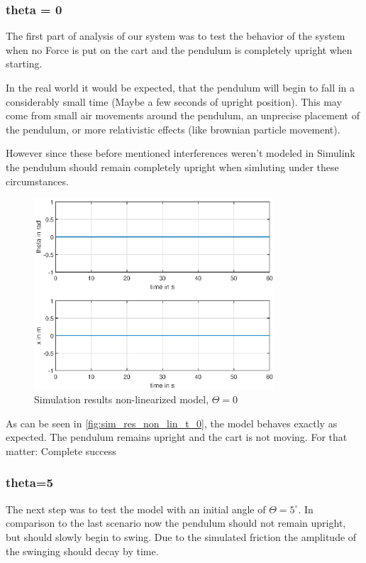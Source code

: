 \subsubsection{theta = 0}
The first part of analysis of our system was to test the behavior of the system when no Force is put on the cart and the pendulum is completely upright when starting.

In the \grqq real world \grqq it would be expected, that the pendulum will begin to fall in a considerably small time (Maybe a few seconds of upright position). This may come from small air movements around the pendulum, an unprecise placement of the pendulum, or more relativistic effects (like brownian particle movement). 

However since these before mentioned interferences weren't modeled in Simulink the pendulum should remain completely upright when simluting under these circumstances. 
\begin{figure}[H]
    \centering
    \includegraphics[width=0.8\textwidth]{Lab_report/pics/plots/non_linearized_results_theta_0.eps}
    \caption{Simulation results non-linearized model, $\Theta=0$}
    \label{fig:sim_res_non_lin_t_0}
\end{figure}

As can be seen in \autoref{fig:sim_res_non_lin_t_0}, the model behaves exactly as expected. The pendulum remains upright and the cart is not moving. For that matter: Complete success

\subsubsection{theta=5}
The next step was to test the model with an initial angle of $\Theta=5^\circ$. In comparison to the last scenario now the pendulum should not remain upright, but should slowly begin to swing. Due to the simulated friction the amplitude of the swinging should decay by time.


